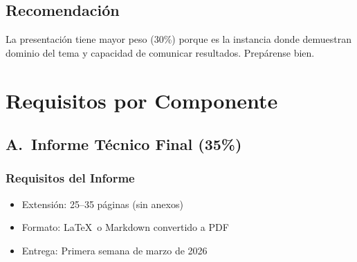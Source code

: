 \documentclass[11pt,a4paper]{article}
\begin{document}
\subsection*{Recomendación}
La presentación tiene mayor peso (30\%) porque es la instancia donde demuestran dominio
del tema y capacidad de comunicar resultados. Prepárense bien.

\section{Requisitos por Componente}
\subsection{A.\ Informe Técnico Final (35\%)}
\subsubsection*{Requisitos del Informe}
\begin{itemize}[leftmargin=*]
\item Extensión: 25--35 páginas (sin anexos)
\item Formato: \LaTeX\ o Markdown convertido a PDF
\item Entrega: Primera semana de marzo de 2026
\end{itemize}
\end{document}
